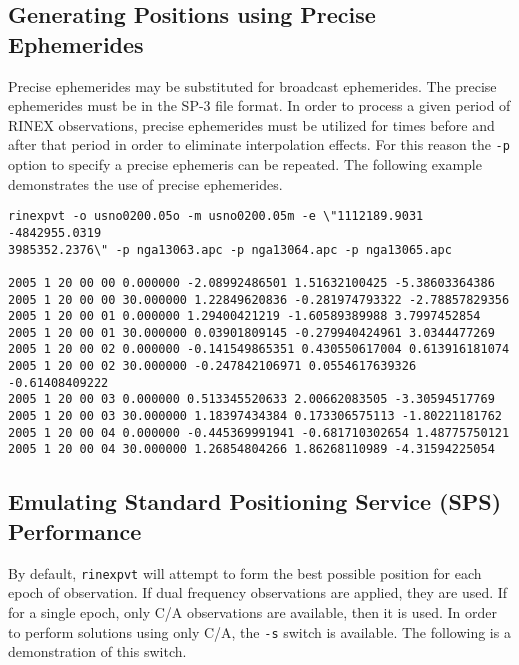 \subsection{Generating Positions using Precise Ephemerides}

Precise ephemerides may be substituted for broadcast ephemerides. The precise
ephemerides must be in the SP-3 file format. In order to process a given
period of RINEX observations, precise ephemerides must be utilized for times
before and after that period in order to eliminate interpolation effects. For
this reason the \texttt{-p} option to specify a precise ephemeris can be
repeated. The following example demonstrates the use of precise ephemerides.

\small
\begin{singlespace}
\begin{verbatim}
rinexpvt -o usno0200.05o -m usno0200.05m -e \"1112189.9031 -4842955.0319
3985352.2376\" -p nga13063.apc -p nga13064.apc -p nga13065.apc 

2005 1 20 00 00 0.000000 -2.08992486501 1.51632100425 -5.38603364386
2005 1 20 00 00 30.000000 1.22849620836 -0.281974793322 -2.78857829356
2005 1 20 00 01 0.000000 1.29400421219 -1.60589389988 3.7997452854
2005 1 20 00 01 30.000000 0.03901809145 -0.279940424961 3.0344477269
2005 1 20 00 02 0.000000 -0.141549865351 0.430550617004 0.613916181074
2005 1 20 00 02 30.000000 -0.247842106971 0.0554617639326 -0.61408409222
2005 1 20 00 03 0.000000 0.513345520633 2.00662083505 -3.30594517769
2005 1 20 00 03 30.000000 1.18397434384 0.173306575113 -1.80221181762
2005 1 20 00 04 0.000000 -0.445369991941 -0.681710302654 1.48775750121
2005 1 20 00 04 30.000000 1.26854804266 1.86268110989 -4.31594225054
\end{verbatim}
\end{singlespace}
\normalsize


\subsection{Emulating Standard Positioning Service (SPS) Performance}

By default, \texttt{rinexpvt} will attempt to form the best possible position
for each epoch of observation. If dual frequency observations are applied,
they are used. If for a single epoch, only C/A observations are available,
then it is used. In order to perform solutions using only C/A, the \texttt{-s}
switch is available. The following is a demonstration of this switch.

